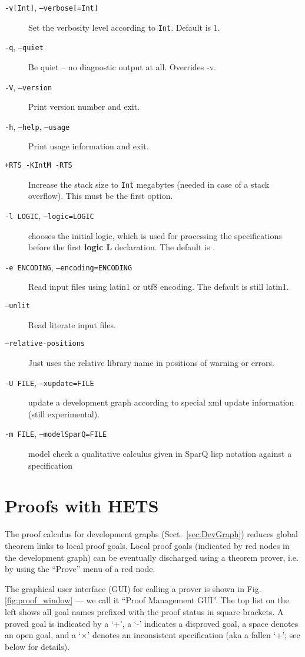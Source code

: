 \documentclass{article}
\newcommand{\normalTEXTSC}[2]{{#1\scriptsize#2}}
\newcommand     {\Hets}{\normalTEXTSC{H}{ETS}\xspace}
\begin{document}
\begin{description}
\item[\texttt{-v[Int]}, \texttt{--verbose[=Int]}]
Set the verbosity level according to \texttt{Int}. Default is 1.
\item[\texttt{-q}, \texttt{--quiet}]
Be quiet -- no diagnostic output at all. Overrides -v.
\item[\texttt{-V}, \texttt{--version}] Print version number and exit.
\item[\texttt{-h}, \texttt{--help}, \texttt{--usage}]
Print usage information and exit.
\item[\texttt{+RTS -KIntM -RTS}] Increase the stack size to
 \texttt{Int} megabytes (needed in case of a stack overflow).
This must be the first option.
\item[\texttt{-l LOGIC}, \texttt{--logic=LOGIC}] chooses the initial logic, which is used for processing the specifications before the first \textbf{logic L}
declaration. The default is \CASL.
\item[\texttt{-e ENCODING}, \texttt{--encoding=ENCODING}] Read input files using latin1 or utf8 encoding. The default is still latin1.
\item[\texttt{--unlit}] Read literate input files.
\item[\texttt{--relative-positions}] Just uses the relative library name in positions of warning or errors.
\item[\texttt{-U FILE}, \texttt{--xupdate=FILE}] update a development graph according to special xml update information (still experimental).
\item[\texttt{-m FILE}, \texttt{--modelSparQ=FILE}] model check a qualitative calculus given in SparQ lisp notation \cite{SparQ06} against a \CASL specification
\end{description}

\section{Proofs with \Hets}\label{sec:Proofs}

The proof calculus for development graphs (Sect.~\ref{sec:DevGraph}) reduces
global theorem links to local proof goals. Local proof goals (indicated by red
nodes in the development graph) can be eventually discharged using a theorem
prover, i.e. by using the ``Prove'' menu of a red node.

The graphical user interface (GUI) for calling a prover is shown in
Fig. \ref{fig:proof_window} --- we call it ``Proof Management GUI''.
The top list on the left shows all goal names prefixed with the proof
status in square brackets. A proved goal is indicated by a `+', a `-'
indicates a disproved goal, a space denotes an open goal, and a
`$\times$' denotes an inconsistent specification (aka a fallen `+';
see below for details).
\end{document}
